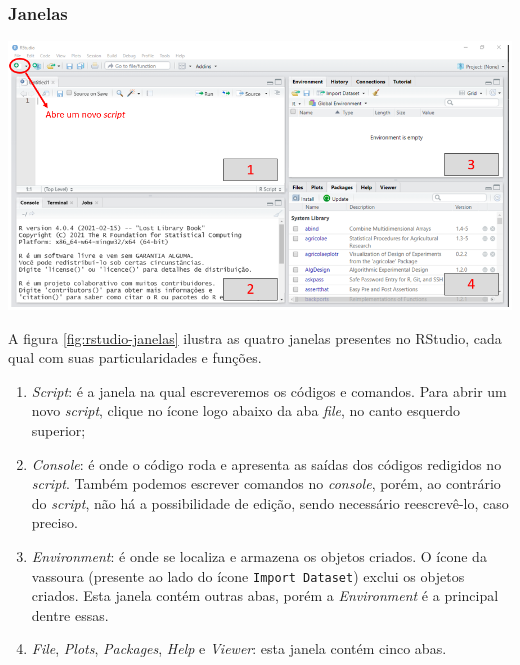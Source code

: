\documentclass[
  brazilian,
]{book}
\let\origfigure\figure
\let\endorigfigure\endfigure
\renewenvironment{figure}[1][2] {
    \expandafter\origfigure\expandafter[H]
} {
    \endorigfigure
}
\begin{document}
\hypertarget{janelas}{%
\subsubsection*{Janelas}\label{janelas}}

\begin{figure}

{\centering \includegraphics[width=0.9\linewidth]{imagens/rstudio_janelas_expl} 

}

\caption{O RStudio apresenta 4 janelas principais, algumas com abas específicas, cada qual apresentando funcionalidades particulares.}\label{fig:rstudio-janelas}
\end{figure}

A figura \ref{fig:rstudio-janelas} ilustra as quatro janelas presentes no RStudio, cada qual com suas particularidades e funções.

\begin{enumerate}
\def\labelenumi{\arabic{enumi}.}
\item
  \emph{Script}: é a janela na qual escreveremos os códigos e comandos. Para abrir um novo \emph{script}, clique no ícone logo abaixo da aba \emph{file}, no canto esquerdo superior;
\item
  \emph{Console}: é onde o código roda e apresenta as saídas dos códigos redigidos no \emph{script}. Também podemos escrever comandos no \emph{console}, porém, ao contrário do \emph{script}, não há a possibilidade de edição, sendo necessário reescrevê-lo, caso preciso.
\item
  \emph{Environment}: é onde se localiza e armazena os objetos criados. O ícone da vassoura (presente ao lado do ícone \texttt{Import\ Dataset}) exclui os objetos criados. Esta janela contém outras abas, porém a \emph{Environment} é a principal dentre essas.
\item
  \emph{File}, \emph{Plots}, \emph{Packages}, \emph{Help} e \emph{Viewer}: esta janela contém cinco abas.
\end{enumerate}
\end{document}

